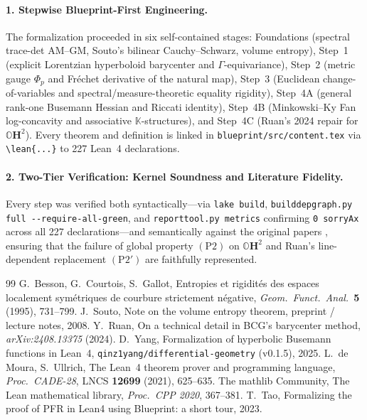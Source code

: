 \documentclass[10pt]{article}
\renewcommand{\_}{\origus\allowbreak}
\newcommand{\Oct}{\mathbb{O}}
\newcommand{\Kfield}{\mathbb{K}}
\newcommand{\Hyp}{\mathbf{H}}
\newcommand{\code}[1]{\texttt{#1}}
\newcommand{\NLeanDecls}{227}
\begin{document}
\paragraph{1. Stepwise Blueprint-First Engineering.}
The formalization proceeded in six self-contained stages: Foundations (spectral trace-det AM--GM,
Souto's bilinear Cauchy--Schwarz, volume entropy), Step~1 (explicit Lorentzian hyperboloid barycenter and
$\Gamma$-equivariance), Step~2 (metric gauge $\Phi_p$ and Fr\'echet derivative of the natural map),
Step~3 (Euclidean change-of-variables and spectral/measure-theoretic equality rigidity), Step~4A (general
rank-one Busemann Hessian and Riccati identity), Step~4B (Minkowski--Ky Fan log-concavity and associative
$\Kfield$-structures), and Step~4C (Ruan's 2024 repair for $\Oct\Hyp^2$). Every theorem and definition is
linked in \code{blueprint/src/content.tex} via \verb|\lean{...}| to \NLeanDecls{} Lean~4 declarations.

\paragraph{2. Two-Tier Verification: Kernel Soundness and Literature Fidelity.}
Every step was verified both syntactically---via \code{lake build}, \code{build\_dep\_graph.py full
-{}-require-all-green}, and \code{report\_tool.py metrics} confirming \code{0 sorryAx} across all
\NLeanDecls{} declarations---and semantically against the original papers \cite{BCG95,Sou08,Rua24},
ensuring that the failure of global property $\mathrm{(P2)}$ on $\Oct\Hyp^2$ and Ruan's line-dependent
replacement $\mathrm{(P2')}$ are faithfully represented.

\begin{thebibliography}{99}\footnotesize\sloppy
\setlength{\itemsep}{1pt}
 G.~Besson, G.~Courtois, S.~Gallot, Entropies et rigidit\'es des espaces localement
  sym\'etriques de courbure strictement n\'egative, \emph{Geom.\ Funct.\ Anal.}\ \textbf{5} (1995), 731--799.
 J.~Souto, Note on the volume entropy theorem, preprint / lecture notes, 2008.
 Y.~Ruan, On a technical detail in BCG's barycenter method, \emph{arXiv:2408.13375} (2024).
 D.~Yang, Formalization of hyperbolic Busemann functions in Lean~4,
  \code{qinz1yang/differential-geometry} (v0.1.5), 2025.
 L.~de Moura, S.~Ullrich, The Lean~4 theorem prover and programming language,
  \emph{Proc.\ CADE-28}, LNCS \textbf{12699} (2021), 625--635.
 The mathlib Community, The Lean mathematical library, \emph{Proc.\ CPP 2020}, 367--381.
 T.~Tao, Formalizing the proof of PFR in Lean4 using Blueprint: a short tour, 2023.
\end{thebibliography}
\end{document}
